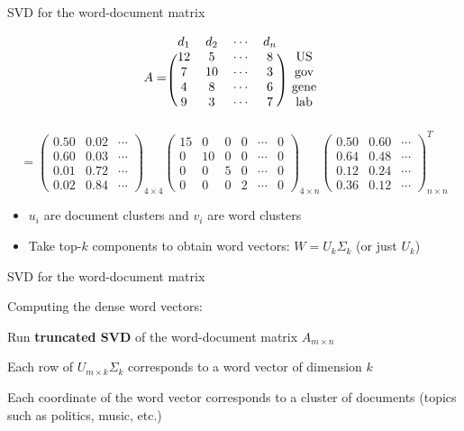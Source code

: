\documentclass[usenames,dvipsnames,notes,11pt,aspectratio=169]{beamer}
\begin{document}
\begin{frame}
    {SVD for the word-document matrix}

    \[
        A=
        \begin{blockarray}{ccccc}
            d_1 & d_2 & \cdots & d_n & \\
\begin{block}{(cccc)c}
  12 & 5   & \cdots & 8 & \text{US} \\
  7  & 10  & \cdots & 3 & \text{gov} \\
  4  & 8   & \cdots & 6 & \text{gene} \\
  9  & 3   & \cdots & 7 & \text{lab} \\
\end{block}
\end{blockarray}
    \]
    \pause
    \[
    =
        \begin{pmatrix}
0.50 & 0.02 & \cdots \\
0.60 & 0.03 & \cdots \\
0.01 & 0.72 & \cdots \\
0.02 & 0.84 & \cdots
\end{pmatrix}_{4 \times 4}
\begin{pmatrix}
15 & 0  & 0  & 0  & \cdots & 0 \\
0  & 10 & 0  & 0  & \cdots & 0 \\
0  & 0  & 5  & 0  & \cdots & 0 \\
0  & 0  & 0  & 2  & \cdots & 0
\end{pmatrix}_{4 \times n}
\begin{pmatrix}
0.50 & 0.60 & \cdots  \\
0.64 & 0.48 & \cdots  \\
0.12 & 0.24 & \cdots  \\
0.36 & 0.12 & \cdots 
\end{pmatrix}_{n \times n}^T
\]

\pause
    \begin{itemize}
        \item $u_i$ are document clusters and $v_i$ are word clusters
        \item Take top-$k$ components to obtain word vectors: $W=U_k\Sigma_k$ (or just $U_k$)
    \end{itemize}
\end{frame}

\begin{frame}
    {SVD for the word-document matrix}

    Computing the dense word vectors:
    \begin{wideitemize}
        \item Run {\bf truncated SVD} of the word-document matrix $A_{m\times n}$
        \item Each row of $U_{m\times k}\Sigma_k$ corresponds to a word vector of dimension $k$
        \item Each coordinate of the word vector corresponds to a cluster of documents (\ie topics such as politics, music, etc.)
    \end{wideitemize}
\end{frame}
\end{document}
